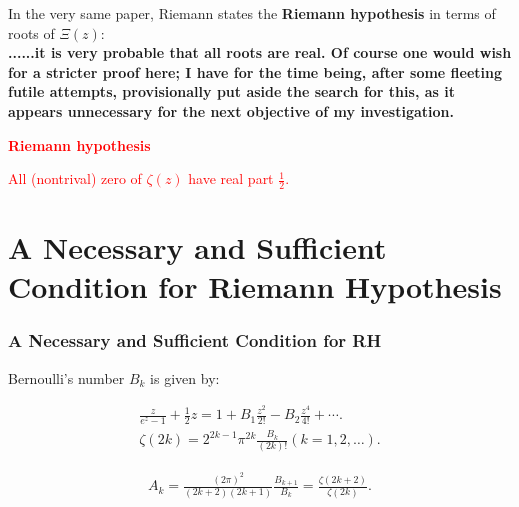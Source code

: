 \documentclass{beamer}
\newcommand{\C}{\mathbb C }
\begin{document}
\frame
{
In the very same paper, Riemann states the \textbf{Riemann hypothesis} in terms
of roots of $\Xi(z)$:\\
\textbf{......it is very probable that all roots are real. Of course one would wish for a stricter proof here; 
I have for the time being, after some fleeting futile attempts, provisionally put aside the search for this, 
as it appears unnecessary for the next objective of my investigation.}

\begin{center}
\textcolor{red}{ \Large \textbf{Riemann hypothesis}}

\textcolor{red}{\Large All (nontrival) zero of $\zeta(z)$ have real part $\frac{1}{2}$.}
\end{center}
}


{
}






\section{A Necessary and Sufficient Condition for Riemann Hypothesis}
\frame
{
\frametitle{A Necessary and Sufficient Condition for RH}

Bernoulli's number $B_k$ is given by:

\begin{align*}
\frac{z}{e^{z} -1} + \frac{1}{2}z =  1 + B_1\frac{z^{2}}{2!} - B_2 \frac{z^{4}}{4!} + \cdots. \\
\zeta(2k) = 2^{2k -1}\pi^{2k}\frac{B_k}{(2k)!}(k = 1, 2, \ldots). 
\end{align*}

\begin{align*}
A_k = \frac{(2\pi)^{2}}{(2k+2)(2k+1)} \frac{B_{k+1}}{B_k} = \frac{\zeta(2k+2)}{\zeta(2k)}.
\end{align*}
}
\end{document}
